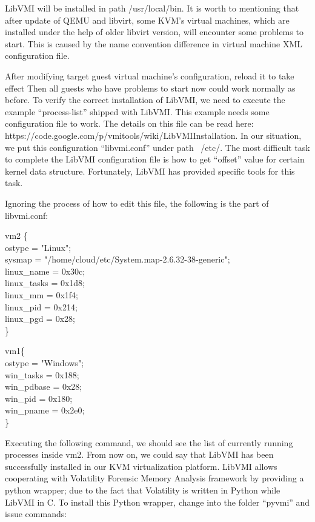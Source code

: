 LibVMI will be installed in path /usr/local/bin. It is worth to mentioning that after update of QEMU and libvirt, 
some KVM's virtual machines, which are installed under the help of older libvirt version, will encounter some problems 
to start. This is caused by the name convention difference in virtual machine XML configuration file.

After modifying target guest virtual machine's configuration, reload it to take effect
Then all guests who have problems to start now could work normally as before. To verify the correct installation of 
LibVMI, we need to execute the example ``process-list'' shipped with LibVMI. This example needs some configuration file 
to work. The details on this file can be read here: https://code.google.com/p/vmitools/wiki/LibVMIInstallation. In our 
situation, we put this configuration ``libvmi.conf'' under path ~/etc/. The most difficult task to complete the LibVMI 
configuration file is how to get ``offset'' value for certain kernel data structure. Fortunately, LibVMI has provided 
specific tools for this task.

Ignoring the process of how to edit this file, the following is the part of libvmi.conf:

vm2 \{\\
	ostype = "Linux";\\
	sysmap = "/home/cloud/etc/System.map-2.6.32-38-generic";\\
	linux\_name = 0x30c;\\
	linux\_tasks = 0x1d8;\\
	linux\_mm = 0x1f4;\\
	linux\_pid = 0x214;\\
	linux\_pgd = 0x28;\\
\}

vm1\{
\\
	ostype = "Windows";
\\
    	win\_tasks   = 0x188;
\\
    	win\_pdbase  = 0x28;
\\
   	win\_pid     = 0x180;\\
    	win\_pname   = 0x2e0;\\
\}

Executing the following command, we should see the list of currently running processes inside vm2.
From now on, we could say that LibVMI has been successfully installed in our KVM virtualization platform. LibVMI allows 
cooperating with Volatility Forensic Memory Analysis framework by providing a python wrapper; due to the fact that 
Volatility is written in Python while LibVMI in C. To install this Python wrapper, change into the folder ``pyvmi'' and 
issue commands:


